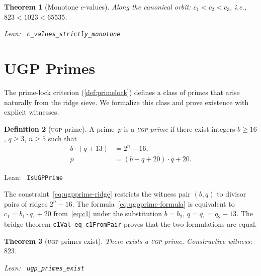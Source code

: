 \documentclass[11pt,a4paper]{article}
\newenvironment{leanref}%
  {\par\smallskip\noindent\begingroup\raggedright\textup{Lean:}~}%
  {\par\endgroup}
\newtheorem{theorem}{Theorem}[section]
\theoremstyle{definition}
\newtheorem{definition}[theorem]{Definition}
\newcommand{\ugp}{\textsc{ugp}}
\begin{document}
\begin{theorem}[Monotone $c$-values]\label{thm:c-mono}
Along the canonical orbit: $c_1 < c_2 < c_3$, i.e.,
$823 < 1023 < 65535$.

\begin{leanref} \lstinline|c_values_strictly_monotone|
\end{leanref}
\end{theorem}

\section{UGP Primes}\label{sec:ugpprimes}

The prime-lock criterion (\cref{def:primelock}) defines a class of
primes that arise naturally from the ridge sieve.  We formalize this
class and prove existence with explicit witnesses.

\begin{definition}[\ugp{} prime]\label{def:ugpprime}
A prime~$p$ is a \emph{\ugp{} prime} if there exist integers
$b \ge 16$, $q \ge 3$, $n \ge 5$ such that
\begin{align}
  b \cdot (q + 13) &= 2^n - 16, \label{eq:ugpprime-ridge}\\
  p &= (b + q + 20) \cdot q + 20. \label{eq:ugpprime-formula}
\end{align}

\begin{leanref} \lstinline|IsUGPPrime|
\end{leanref}
\end{definition}

The constraint~\eqref{eq:ugpprime-ridge} restricts the witness pair
$(b, q)$ to divisor pairs of ridges $2^n - 16$.  The
formula~\eqref{eq:ugpprime-formula} is equivalent to $c_1 = b_1 \cdot
q_1 + 20$ from~\eqref{eq:c1} under the substitution $b = b_2$,
$q = q_1 = q_2 - 13$.  The bridge theorem \texttt{c1Val\_eq\_c1FromPair}
proves that the two formulations are equal.

\begin{theorem}[\ugp{} primes exist]\label{thm:ugp-exist}
There exists a \ugp{} prime.  Constructive witness: $823$.

\begin{leanref} \lstinline|ugp_primes_exist|
\end{leanref}
\end{theorem}
\end{document}
